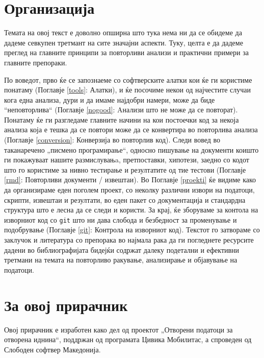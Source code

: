 \documentclass[
]{book}
\begin{document}
\hypertarget{organ}{%
\section{Организација}\label{organ}}

Темата на овој текст е доволно опширна што тука нема ни да се обидеме да дадеме севкупен третмант на сите значајни аспекти. Туку, целта е да дадеме преглед на главните принципи за повторливи анализи и практични примери за главните препораки.

По воведот, прво ќе се запознаеме со софтверските алатки кои ќе ги користиме понатаму (Поглавје \ref{tools}: Алатки), и ќе посочиме некои од најчестите случаи кога една анализа, дури и да имаме најдобри намери, може да биде ``неповторлива`` (Поглавје \ref{nogood}: Aнализи што не може да се повторат). Понатаму ќе ги разгледаме главните начини на кои постоечки код за некоја анализа која е тешка да се повтори може да се конвертира во повторлива анализа (Поглавје \ref{conversion}: Конверзија во повторлив код). Следи вовед во таканаречено „писмено програмирање``, односно пишување на документи коишто ги покажуваат нашите размислувањa, претпоставки, хипотези, заедно со кодот што го користиме за нивно тестирање и резултатите од тие тестови (Поглавје \ref{rmd}: Повторливи документи / извештаи). Во Поглавје \ref{proekti} ќе видиме како да организираме еден поголем проект, со неколку различни извори на податоци, скрипти, извештаи и резултати, во еден пакет со документација и стандардна структура што е лесна да се следи и користи. За крај, ќе зборуваме за контола на изворниот код со \texttt{git} што ни дава слобода и безбедност за променување и подобрување (Поглавје \ref{git}: Контрола на изворниот код). Текстот го затвораме со заклучок и литература со препорака во најмала рака да ги погледнете ресурсите дадени во библиографијата бидејќи содржат далеку подетални и ефективни третмани на темата на повторливо ракување, анализирање и објавување на податоци.

\hypertarget{ux437ux430-ux43eux432ux43eux458-ux43fux440ux438ux440ux430ux447ux43dux438ux43a}{%
\section{За овој прирачник}\label{ux437ux430-ux43eux432ux43eux458-ux43fux440ux438ux440ux430ux447ux43dux438ux43a}}

Овој прирачник е изработен како дел од проектот „Отворени податоци за отворена иднина``, поддржан од програмата Цивика Мобилитас, а спроведен од Слободен софтвер Македонија.
\end{document}
